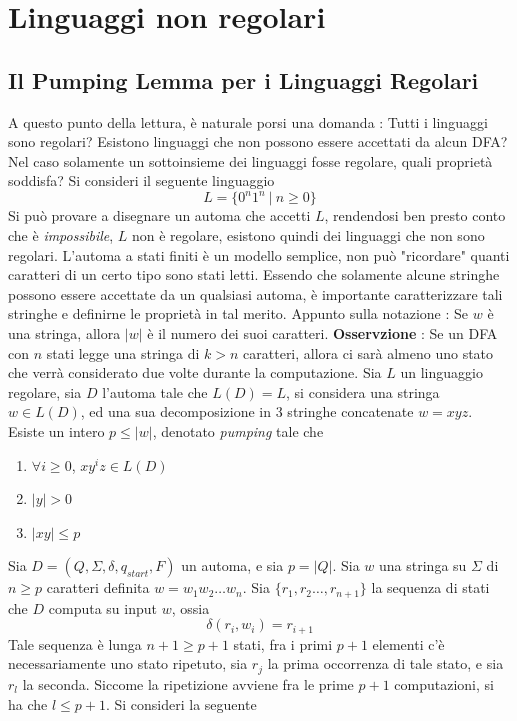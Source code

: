 \documentclass[10pt, letterpaper]{report}
\begin{document}
\section{Linguaggi non regolari}
\subsection{Il Pumping Lemma per i Linguaggi Regolari}
A questo punto della lettura, è naturale porsi una domanda : Tutti i linguaggi sono regolari? Esistono linguaggi che 
non possono essere accettati da alcun DFA? Nel caso solamente un sottoinsieme dei linguaggi fosse regolare, quali proprietà 
soddisfa? Si consideri il seguente linguaggio 
$$ L=\{0^n1^n \ | \ n\ge 0\}$$
Si può provare a disegnare un automa che accetti $L$, rendendosi ben presto conto che è \textit{impossibile}, $L$ non è 
regolare, esistono quindi dei linguaggi che non sono regolari. L'automa a stati finiti è un modello semplice, non può 
"ricordare" quanti caratteri di un certo tipo sono stati letti. \acc 
Essendo che solamente alcune stringhe possono essere accettate da un qualsiasi automa, è importante caratterizzare tali 
stringhe e definirne le proprietà in tal merito. \acc 
Appunto sulla notazione : Se $w$ è una stringa, allora $|w|$ è il numero dei suoi caratteri.\acc
\textbf{Osservzione} : Se un DFA con $n$ stati legge una stringa di $k>n$ caratteri, allora ci sarà almeno uno stato 
che verrà considerato due volte durante la computazione. \acc 
{} Sia $L$ un linguaggio regolare, sia $D$ l'automa tale che $L(D)=L$, si considera una stringa 
$w\in L(D)$, ed una sua decomposizione in 3 stringhe concatenate $w=xyz$. Esiste un intero $p\le|w|$, denotato \textit{pumping}
 tale che \begin{enumerate}
    \item $\forall i\ge0$, $xy^iz\in L(D)$
    \item $|y|>0$
    \item $|xy|\le p$
\end{enumerate}
\dimo{} Sia $D=(Q,\Sigma,\delta,q_{start},F)$ un automa, e sia $p=|Q|$. Sia $w$ una stringa su $\Sigma$ di $n\ge p$ caratteri definita
$w=w_1w_2\dots w_n$. Sia $\{r_1,r_2\dots,r_{n+1}\}$ la sequenza di stati che $D$ computa su input $w$, ossia 
$$ \delta(r_i,w_i)=r_{i+1}$$
Tale sequenza è lunga $n+1\ge p+1$ stati, fra i primi $p+1$ elementi c'è necessariamente uno stato ripetuto, sia 
 $r_j$ la prima occorrenza di tale stato, e sia $r_l$ la seconda.\acc 
 Siccome la ripetizione avviene fra le prime $p+1$ computazioni, si ha che $l\le p+1$. Si consideri la seguente 
\end{document}
